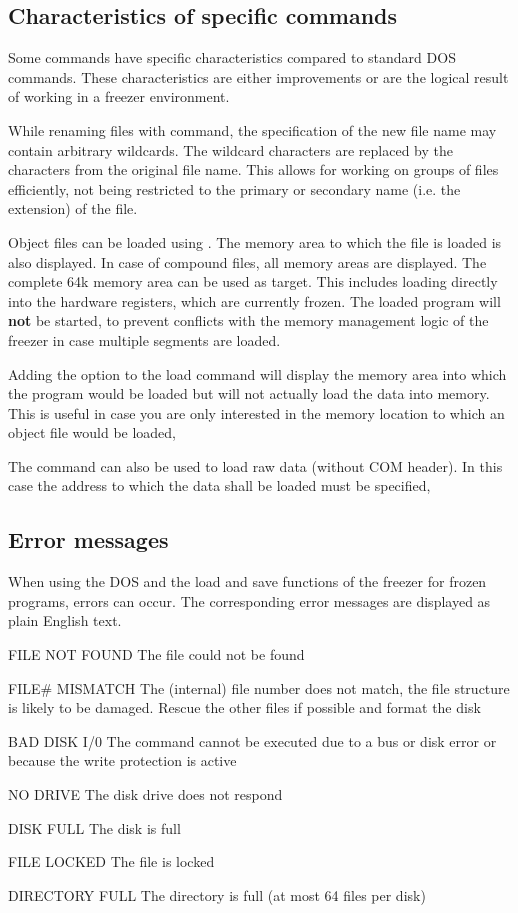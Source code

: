 \subsection{Characteristics of specific commands}
Some commands have specific characteristics compared to standard DOS commands.
These characteristics are either improvements or are the logical result of
working in a freezer environment.

While renaming files with   command, the specification of the new file
name may contain arbitrary wildcards. The wildcard characters are replaced by
the characters from the original file name. This allows for working on groups of
files efficiently, not being restricted to the primary or secondary name (i.e.
the extension) of the file.

Object files can be loaded using . The memory area to which the file
is loaded is also displayed. In case of compound files, all memory areas are
displayed. The complete 64k memory area can be used as target.  This includes
loading directly into the hardware registers, which are currently frozen. The
loaded program will \textbf{not} be started, to prevent conflicts with the
memory management logic of the freezer in case multiple segments are loaded.

Adding the option  to the load command will display the memory area
into which the program would be loaded but will not actually load the data into
memory. This is useful in case you are only interested in the memory location to
which an object file would be loaded, \ie


The command  can also be used to load raw data (without COM header).
In this case the address to which the data shall be loaded must be specified, \ie


\subsection{Error messages}
When using the DOS and the load and save functions of the freezer for frozen
programs, errors can occur. The corresponding error messages are displayed 
as plain English text.

\begin{fmsglist}
\item[FILE NOT FOUND]
The file could not be found
\item[FILE\# MISMATCH]
The (internal) file number does not match, the file structure is likely
to be damaged. Rescue the other files if possible and format the disk
\item[BAD DISK I/0]
The command cannot be executed due to a bus or disk error or because
the write protection is active
\item[NO DRIVE]
The disk drive does not respond
\item[DISK FULL]
The disk is full
\item[FILE LOCKED]
The file is locked
\item[DIRECTORY FULL]
The directory is full (at most 64 files per disk)
\end{fmsglist}
